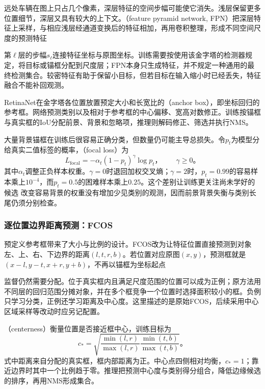 远处车辆在图上只占几个像素，深层特征的空间步幅可能使它消失。浅层保留更多位置细节，深层又具有较大的上下文。（feature pyramid network, FPN）把深层特征上采样，与相应浅层经通道变换后的特征相加，再用卷积整理，形成不同空间尺度的预测特征

第$\ell$层的步幅$s_\ell$连接特征坐标与原图坐标。训练需要按使用该金字塔的检测器规定，将目标或锚框分配到尺度层；FPN本身只生成特征，并不规定一种通用的最终检测集合。较密特征有助于保留小目标，但若目标在输入缩小时已经丢失，特征融合不能补回观测。

RetinaNet在金字塔各位置放置预定大小和长宽比的（anchor box），即坐标回归的参考框。网络预测类别以及相对于参考框的中心偏移、宽高对数修正。训练按锚框与真实框的IoU分配前景、背景和忽略项，推理则解码修正、筛选并执行NMS。

大量背景锚框在训练后很容易正确分类，但数量仍可能主导总损失。令$p_t$为模型分给真实二值标签的概率，（focal loss）为
\begin{equation}
 L_{\mathrm{focal}}=-\alpha_t(1-p_t)^\gamma\log p_t\text{，}
 \qquad\gamma\geq0\text{。}
 \label{eq:vision-focal-loss}
\end{equation}
其中$\alpha_t$调整正负样本权重。$\gamma=0$时退回加权交叉熵；$\gamma=2$时，$p_t=0.99$的容易样本乘上$10^{-4}$，而$p_t=0.5$的困难样本乘上$0.25$。这个差别让训练更关注尚未学好的候选
改变容易背景的权重没有增加少见类别的观测，因而前景背景失衡与类别长尾仍须分别检查。

\subsubsection{逐位置边界距离预测：FCOS}
\label{sec:vision-recognition-fcos}

预定义参考框带来了大小与比例的设计。FCOS改为让特征位置直接预测到对象左、上、右、下边界的距离$(l,t,r,b)$。若位置对应原图$(x,y)$，预测框就是$(x-l,y-t,x+r,y+b)$，不再以锚框为坐标起点

监督仍然需要分配。位于真实框内且满足尺度范围的位置可以成为正例；原方法用不同层的回归范围分摊对象，并在多个框竞争一个位置时选择面积较小的框。负例只学习分类，正例还学习距离及中心度。这里描述的是原始FCOS，后续采用中心区域采样等改动时应另记配置。

（centerness）衡量位置是否接近框中心，训练目标为
\begin{equation}
 c_*=\sqrt{\frac{\min(l,r)}{\max(l,r)}
                 \frac{\min(t,b)}{\max(t,b)}}\text{。}
 \label{eq:vision-fcos-centerness}
\end{equation}
式中距离来自分配的真实框，框内部距离为正。中心点四侧相对均衡，$c_*=1$；靠近边界时其中一个比例趋于零。推理把预测中心度与类别得分组合，降低边缘候选的排序，再用NMS形成集合。

